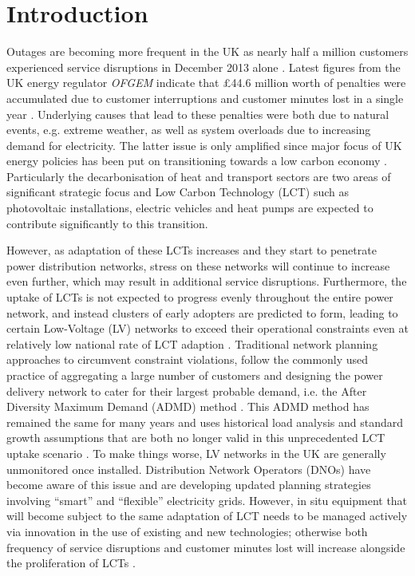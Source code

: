 \section{Introduction}
\label{ch2:sec:introduction}

Outages are becoming more frequent in the UK as nearly half a million customers experienced service disruptions in December 2013 alone \cite{Ofgem2014}.
Latest figures from the UK energy regulator \textit{OFGEM} indicate that \pounds44.6 million worth of penalties were accumulated due to customer interruptions and customer minutes lost in a single year \cite{Ofgem2012}.
Underlying causes that lead to these penalties were both due to natural events, e.g. extreme weather, as well as system overloads due to increasing demand for electricity.
The latter issue is only amplified since major focus of UK energy policies has been put on transitioning towards a low carbon economy \cite{HMGovernment2009, RoyalAcademyofEngineering2010}.
Particularly the decarbonisation of heat and transport sectors are two areas of significant strategic focus and Low Carbon Technology (LCT) such as photovoltaic installations, electric vehicles and heat pumps are expected to contribute significantly to this transition.

However, as adaptation of these LCTs increases and they start to penetrate power distribution networks, stress on these networks will continue to increase even further, which may result in additional service disruptions.
Furthermore, the uptake of LCTs is not expected to progress evenly throughout the entire power network, and instead clusters of early adopters are predicted to form, leading to certain Low-Voltage (LV) networks to exceed their operational constraints even at relatively low national rate of LCT adaption \cite{Poghosyan2014}.
Traditional network planning approaches to circumvent constraint violations, follow the commonly used practice of aggregating a large number of customers and designing the power delivery network to cater for their largest probable demand, i.e. the After Diversity Maximum Demand (ADMD) method \cite{Richardson2010a}.
This ADMD method has remained the same for many years and uses historical load analysis and standard growth assumptions that are both no longer valid in this unprecedented LCT uptake scenario \cite{Yunusov2016}.
To make things worse, LV networks in the UK are generally unmonitored once installed.
Distribution Network Operators (DNOs) have become aware of this issue and are developing updated planning strategies involving ``smart'' and ``flexible'' electricity grids.
However, in situ equipment that will become subject to the same adaptation of LCT needs to be managed actively via innovation in the use of existing and new technologies; otherwise both frequency of service disruptions and customer minutes lost will increase alongside the proliferation of LCTs \cite{Ault2008a}.

